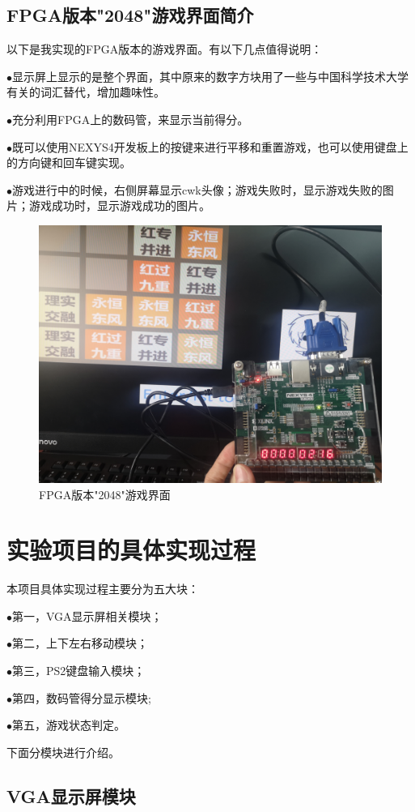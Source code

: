 \documentclass[UTF8]{article}
\newcommand{\keypoint}[1]{$\bullet$\quad#1\par}
\begin{document}
	\subsection{FPGA版本"2048"游戏界面简介}
	以下是我实现的FPGA版本的游戏界面。有以下几点值得说明：\par
	\keypoint{显示屏上显示的是整个界面，其中原来的数字方块用了一些与中国科学技术大学有关的词汇替代，增加趣味性。}
	\keypoint{充分利用FPGA上的数码管，来显示当前得分。}
	\keypoint{既可以使用NEXYS4开发板上的按键来进行平移和重置游戏，也可以使用键盘上的方向键和回车键实现。}
	\keypoint{游戏进行中的时候，右侧屏幕显示cwk头像；游戏失败时，显示游戏失败的图片；游戏成功时，显示游戏成功的图片。}
	\begin{figure}[H]
		\centering
		\includegraphics[scale=0.07]{gaming.jpg}
		\caption{FPGA版本"2048"游戏界面}
		\label{gaming}
	\end{figure}\par

	\section{实验项目的具体实现过程}
	本项目具体实现过程主要分为五大块：\par
	\keypoint{第一，VGA显示屏相关模块；}
	\keypoint{第二，上下左右移动模块；}
	\keypoint{第三，PS2键盘输入模块；}
	\keypoint{第四，数码管得分显示模块;}
	\keypoint{第五，游戏状态判定。}
	下面分模块进行介绍。
	\subsection{VGA显示屏模块}
\end{document}
